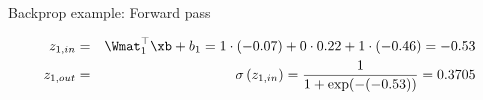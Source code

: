 \begin{vbframe}{Backprop example: Forward pass}
\begin{itemize}
  \begin{figure}
    \centering
  \end{figure}
  \begin{footnotesize}
    \begin{eqnarray*}
    z_{1,in} &=& \Wmat_1^\top \xb + b_1 =  1 \cdot (-0.07) + 0 \cdot 0.22 + 1 \cdot (-0.46) = -0.53 \\
    z_{1,out} &=& \sigma\left(z_{1,in}\right) = \frac{1}{1+\exp(-(-0.53))} = \num[round-mode=places,round-precision=4]{0.3705169}
    \end{eqnarray*}
  \end{footnotesize}
  \end{itemize}
\framebreak

\end{vbframe}
